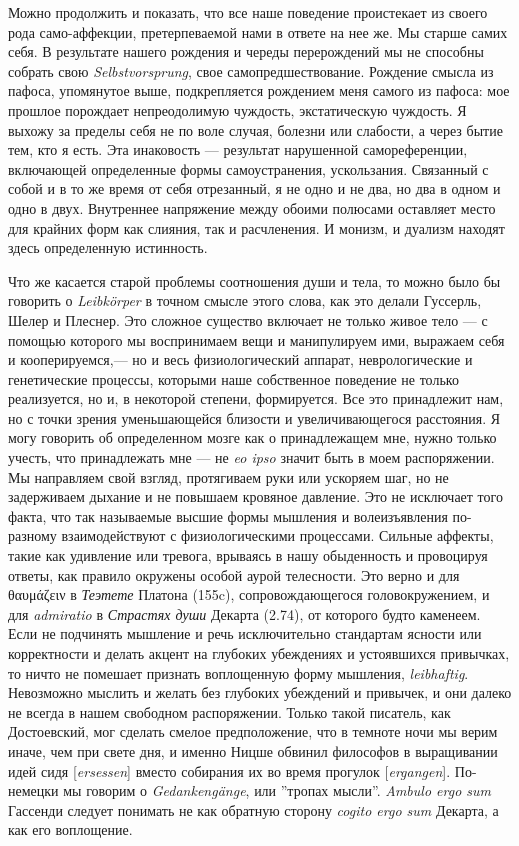 \documentclass[12pt]{book}
\begin{document}
Можно продолжить и показать, что все наше поведение проистекает из своего рода само-аффекции, претерпеваемой нами в ответе на нее же. Мы старше самих себя. В результате нашего рождения и череды перерождений мы не способны собрать свою \textit{Selbstvorsprung}, свое самопредшествование. Рождение смысла из пафоса, упомянутое выше, подкрепляется рождением меня самого из пафоса: мое прошлое порождает непреодолимую чуждость, экстатическую чуждость. Я выхожу за пределы себя не по воле случая, болезни или слабости, а через бытие тем, кто я есть. Эта инаковость --- результат нарушенной самореференции, включающей определенные формы самоустранения, ускользания. Связанный с собой и в то же время от себя отрезанный, я не одно и не два, но два в одном и одно в двух. Внутреннее напряжение между обоими полюсами оставляет место для крайних форм как слияния, так и расчленения. И монизм, и дуализм находят здесь определенную истинность.

Что же касается старой проблемы соотношения души и тела, то можно было бы говорить о \textit{Leibkörper} в точном смысле этого слова, как это делали Гуссерль, Шелер и Плеснер. Это сложное существо включает не только живое тело --- с помощью которого мы воспринимаем вещи и манипулируем ими, выражаем себя и кооперируемся,--- но и весь физиологический аппарат, неврологические и генетические процессы, которыми наше собственное поведение не только реализуется, но и, в некоторой степени, формируется. Все это принадлежит нам, но с точки зрения уменьшающейся близости и увеличивающегося расстояния. Я могу говорить об определенном мозге как о принадлежащем мне, нужно только учесть, что принадлежать мне --- не \textit{eo ipso} значит быть в моем распоряжении. Мы направляем свой взгляд, протягиваем руки или ускоряем шаг, но не задерживаем дыхание и не повышаем кровяное давление. Это не исключает того факта, что так называемые высшие формы мышления и волеизъявления по-разному взаимодействуют с физиологическими процессами. Сильные аффекты, такие как удивление или тревога, врываясь в нашу обыденность и провоцируя ответы, как правило окружены особой аурой телесности. Это верно и для θαυμάζειν в \textit{Теэтете} Платона (155c), сопровождающегося головокружением, и для \textit{admiratio} в \textit{Страстях души} Декарта (2.74), от которого будто каменеем. Если не подчинять мышление и речь исключительно стандартам ясности или корректности и делать акцент на глубоких убеждениях и устоявшихся привычках, то ничто не помешает признать воплощенную форму мышления, \textit{leibhaftig}. Невозможно мыслить и желать без глубоких убеждений и привычек, и они далеко не всегда в нашем свободном распоряжении. Только такой писатель, как Достоевский, мог сделать смелое предположение, что в темноте ночи мы верим иначе, чем при свете дня, и именно Ницше обвинил философов в выращивании идей сидя [\textit{ersessen}] вместо собирания их во время прогулок [\textit{ergangen}]. По-немецки мы говорим о \textit{Gedankengänge}, или ''тропах мысли''. \textit{Ambulo ergo sum} Гассенди следует понимать не как обратную сторону \textit{cogito ergo sum} Декарта, а как его воплощение.
\end{document}
